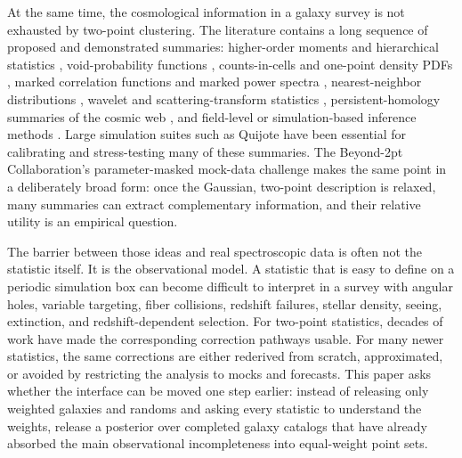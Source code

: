 \documentclass[apj]{emulateapj}
\begin{document}
At the same time, the cosmological information in a galaxy survey is not
exhausted by two-point clustering.  The literature contains a long sequence of
proposed and demonstrated summaries: higher-order moments and hierarchical
statistics \citep{SzapudiSzalay1993,FryGaztanaga1993}, void-probability
functions \citep{Einasto1991}, counts-in-cells and one-point density PDFs
\citep{Baugh1995,Szapudi1996,Uhlemann2020,Friedrich2020}, marked correlation
functions and marked power spectra \citep{Harker2006,Satpathy2019,Massara2021,
Massara2023}, nearest-neighbor distributions \citep{BanerjeeAbel2021,Yuan2024},
wavelet and scattering-transform statistics \citep{Cheng2020,Valogiannis2022,
Regaldo2024}, persistent-homology summaries of the cosmic web
\citep{Wilding2021,Biagetti2022,Yip2024}, and field-level or
simulation-based inference methods \citep{JascheWandelt2013,Nguyen2024,
Lemos2024,Hahn2023Mock,Hahn2023PNAS,Hahn2024NatAs,Hahn2024Bispectrum,
Massara2025SBI}.  Large simulation suites such as Quijote
\citep{Quijote2020} have been essential for calibrating and stress-testing
many of these summaries.  The Beyond-2pt Collaboration's parameter-masked mock-data
challenge \citep{Beyond2pt2025} makes the same point in a deliberately broad
form: once the Gaussian, two-point description is relaxed, many summaries can
extract complementary information, and their relative utility is an empirical
question.

The barrier between those ideas and real spectroscopic data is often not the
statistic itself.  It is the observational model.  A statistic that is easy to
define on a periodic simulation box can become difficult to interpret in a
survey with angular holes, variable targeting, fiber collisions, redshift
failures, stellar density, seeing, extinction, and redshift-dependent selection.
For two-point statistics, decades of work have made the corresponding
correction pathways usable.  For many newer statistics, the same corrections
are either rederived from scratch, approximated, or avoided by restricting the
analysis to mocks and forecasts.  This paper asks whether the interface can be
moved one step earlier: instead of releasing only weighted galaxies and
randoms and asking every statistic to understand the weights, release a
posterior over completed galaxy catalogs that have already absorbed the main
observational incompleteness into equal-weight point sets.
\end{document}
